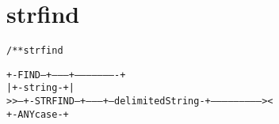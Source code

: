 \section{strfind}
\begin{shaded}
\begin{alltt}
/** strfind

       +-FIND--+--------+----------------------+
       |       +-string-+                      |
   >>--+-STRFIND--+---------+--delimitedString-+--------------------------><
                  +-ANYcase-+

\end{alltt}
\end{shaded}
